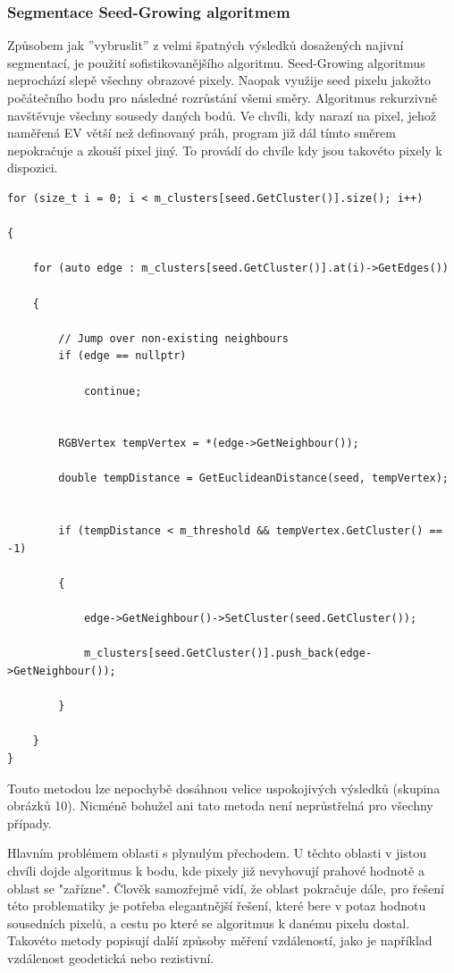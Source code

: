 \documentclass[czech, master, public, dept460, male, cpdeclaration, oneside]{diploma}
\begin{document}
\subsubsection{Segmentace Seed-Growing algoritmem}
Způsobem jak ''vybruslit'' z velmi špatných výsledků dosažených najivní segmentací, je použití sofistikovanějšího algoritmu. Seed-Growing algoritmus neprochází slepě všechny obrazové pixely. Naopak využije seed pixelu jakožto počátečního bodu pro následné rozrůstání všemi směry. Algoritmus rekurzivně navštěvuje všechny sousedy daných bodů. Ve chvíli, kdy narazí na pixel, jehož naměřená EV větší než definovaný práh, program již dál tímto směrem nepokračuje a zkouší pixel jiný. To provádí do chvíle kdy jsou takovéto pixely k dispozici. \par

\begin{lstlisting}[label=src:Cpp,caption=Seed-Grow algoritmus,aboveskip=3em]
for (size_t i = 0; i < m_clusters[seed.GetCluster()].size(); i++)

{

	for (auto edge : m_clusters[seed.GetCluster()].at(i)->GetEdges())

	{

		// Jump over non-existing neighbours
		if (edge == nullptr)

			continue;

		
		RGBVertex tempVertex = *(edge->GetNeighbour());

		double tempDistance = GetEuclideanDistance(seed, tempVertex);

		
		if (tempDistance < m_threshold && tempVertex.GetCluster() == -1)

		{

			edge->GetNeighbour()->SetCluster(seed.GetCluster());

			m_clusters[seed.GetCluster()].push_back(edge->GetNeighbour());

		}

	}
}

\end{lstlisting}
Touto metodou lze nepochybě dosáhnou velice uspokojivých výsledků (skupina obrázků 10). Nicméně bohužel ani tato metoda není neprůstřelná pro všechny případy. \par 
Hlavním problémem oblasti s plynulým přechodem. U těchto oblasti v jistou chvíli dojde algoritmus k bodu, kde pixely již nevyhovují prahové hodnotě a oblast se "zařízne". Člověk samozřejmě vidí, že oblast pokračuje dále, pro řešení této problematiky je potřeba elegantnější řešení, které bere v potaz hodnotu sousedních pixelů, a cestu po které se algoritmus k danému pixelu dostal. Takovéto metody popisují další způsoby měření vzdáleností, jako je například vzdálenost geodetická nebo rezistivní. \par
\end{document}

